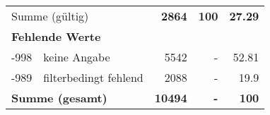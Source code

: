 \begin{longtable}{lXrrr}
     \midrule
     \multicolumn{2}{l}{Summe (gültig)} &
       \textbf{\num{2864}} &
     \textbf{\num{100}} &
       \textbf{\num[round-mode=places,round-precision=2]{27.29}} \\
     \multicolumn{5}{l}{\textbf{Fehlende Werte}}\\
       -998 &
       keine Angabe &
         \num{5542} &
        - &
         \num[round-mode=places,round-precision=2]{52.81} \\
       -989 &
       filterbedingt fehlend &
         \num{2088} &
        - &
         \num[round-mode=places,round-precision=2]{19.9} \\
     \midrule
     \multicolumn{2}{l}{\textbf{Summe (gesamt)}} &
          \textbf{\num{10494}} &
        \textbf{-} &
        \textbf{\num{100}} \\
     \bottomrule
     \end{longtable}
     
